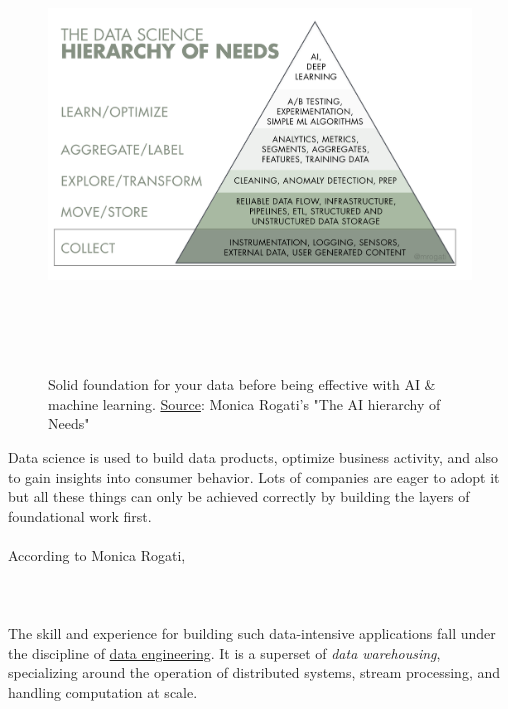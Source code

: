 \begin{figure}[h!]
  \centering
  \includegraphics[width=14cm,height=12cm,keepaspectratio]{../media/crawler/data_hierarchy.png}
  \caption{Solid foundation for your data before being effective with AI \& machine learning. \underline{Source}: Monica Rogati's "The AI hierarchy of Needs"\cite{datasci}}
  \label{fig:datahierarchy}
\end{figure}

\noindent
Data science is used to build data products, optimize business activity, and also to gain insights into
consumer behavior. Lots of companies are eager to adopt it but all these things can only be achieved correctly
by building the layers of foundational work first.
\\
\\
According to Monica Rogati,
\\
\\
\\
\\
\noindent
The skill and experience for building such data-intensive applications fall under the discipline of
\underline{data engineering}\cite{dataengr}. It is a superset of \textit{data warehousing}, specializing
around the operation of distributed systems, stream processing, and handling computation at scale.


